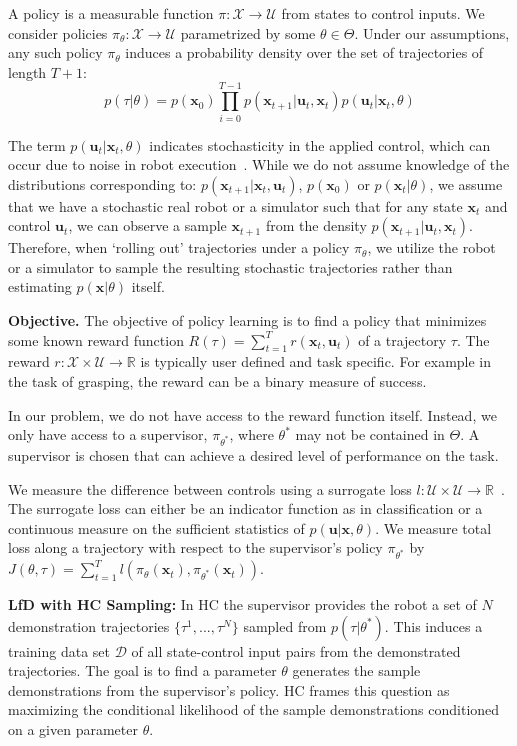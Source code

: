 \documentclass[10pt, conference]{ieeeconf}      %
\newcommand{\bu}{\mathbf{u}}
\newcommand{\bx}{\mathbf{x}}
\newcommand{\ns}{HC }
\begin{document}
A policy is a measurable function $\pi: \mathcal{X} \to \mathcal{U}$ from states to control inputs. 
We consider policies $\pi_{\theta}:\mathcal{X}\to \mathcal{U}$ parametrized by some $\theta\in \Theta$. Under our assumptions, any such policy $\pi_{\theta}$ induces a probability density over the set of  trajectories of length $T+1$: $$p(\tau | \theta)=
p(\bx_0)\prod_{i=0}^{T-1}p(\bx_{t+1}|\bu_t,\bx_t)p(\bu_t|\bx_t,\theta)$$


The term $p(\bu_t|\bx_t,\theta)$ indicates stochasticity in the applied control, which can occur due to noise in robot execution~\cite{mahler2014learning}.
While we do not assume knowledge of the distributions corresponding to: $p(\bx_{t+1}|\bx_t,\bu_t)$, $p(\bx_0)$ or $p(\bx_t|
\theta)$, we assume that we have a stochastic real robot or a simulator such that for any state
$\bx_t$ and control $\bu_t$, we can observe a sample $\bx_{t+1}$ from the density $p(\bx_{t+1}|\bu_t,\bx_t)$. 
Therefore, when `rolling out' trajectories under a policy
$\pi_{\theta}$, we utilize the robot or a simulator to sample the resulting stochastic trajectories rather than
estimating $p(\bx|\theta)$ itself.


\noindent\textbf{Objective.} The objective of policy learning is to find a policy that minimizes some known reward function $R(\tau) = \sum^T_{t=1} r(\bx_t,\bu_t)$ of a trajectory $\tau$. The reward $r:\mathcal{X}\times \mathcal{U}\to \mathbb{R}$ is typically user defined and task specific. 
For example in the task of grasping, the reward can be a binary measure of success.

In our problem, we do not have access to the reward function itself. Instead, we only have access to 
a supervisor, $\pi_{\theta^*}$, where $\theta^*$ may not be contained in $\Theta$. A supervisor is chosen that can achieve a desired level of performance on the task.

We measure the difference between controls using a surrogate loss $l : \mathcal{U} \times \mathcal{U} \rightarrow \mathbb{R}$~\cite{ross2010reduction,ross2010efficient}.
The surrogate loss can either be an indicator function as in classification or a continuous measure on the sufficient statistics of $p(\bu|\bx,\theta)$.
We measure total loss along a trajectory with respect to the supervisor's policy $\pi_{\theta^*}$ by $J(\theta, \tau) = \sum^T_{t=1} l(\pi_{\theta}(\bx_{t}),\pi_{\theta^*}(\bx_{t}))$.

\noindent \textbf{LfD with \ns Sampling:} In \ns the supervisor provides the robot a set of $N$ demonstration trajectories $\lbrace \tau^1,...,\tau^N \rbrace$ sampled from $p(\tau | \theta^*)$.
This induces a training data set $\mathcal{D}$ of all state-control input pairs from the demonstrated trajectories.
The goal is to find a parameter $\theta$ generates the sample demonstrations from the supervisor's policy.
\ns frames this  question as maximizing the conditional likelihood of the sample demonstrations conditioned on a given parameter $\theta$. 
\end{document}
